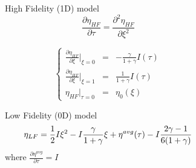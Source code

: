 \documentclass[8pt]{beamer}
\begin{document}
\begin{frame}
\begin{itemize}
\end{itemize}
\vspace{-0.1in}
\begin{columns}
\begin{column}{.47\textwidth}
\begin{block}{High Fidelity (1D) model}
\vspace{-0.05in}
\begin{equation*}\label{eq:HF}
\frac{\partial\eta_{HF}}{\partial\tau} = \frac{\partial^2\eta_{HF}}{\partial\xi^2}
\end{equation*}
\vspace{-0.1in}
\begin{small}
\begin{equation*}
\left\{\begin{matrix}
\frac{\partial\eta_{HF}}{\partial\xi}|_{\xi=0} & = & -\frac{\gamma}{1+\gamma}I(\tau)\\
\frac{\partial\eta_{HF}}{\partial\xi}|_{\xi=1} & = & \frac{1}{1+\gamma}I(\tau) \nonumber\\
\eta_{HF}|_{\tau=0} 					       & =  & \eta_0(\xi)
\end{matrix}\right.
\end{equation*}
\end{small}
\vspace{-0.05in}
\end{block}
\vspace{-0.08in}
\begin{block}{Low Fidelity (0D) model}
 \vspace{-0.15in}
\begin{eqnarray*}\label{eq:LF}
\eta_{LF} = \frac{1}{2}I\xi^2- I \frac{\gamma}{1+\gamma}\xi + {\eta}^{avg}(\tau)
			 - I\frac{2\gamma-1}{6(1+\gamma)}
	\vspace{-0.3in}		 
\end{eqnarray*}
where $\frac{\partial{\eta}^{avg}}{\partial\tau} = I$
\end{block}
\end{column}
\begin{column}{.5\textwidth}
\begin{center}
\vspace{-0.35in}
\begin{figure}[h]

\end{figure}
\end{center}
\end{column}
\end{columns}
\end{frame}
\end{document}
